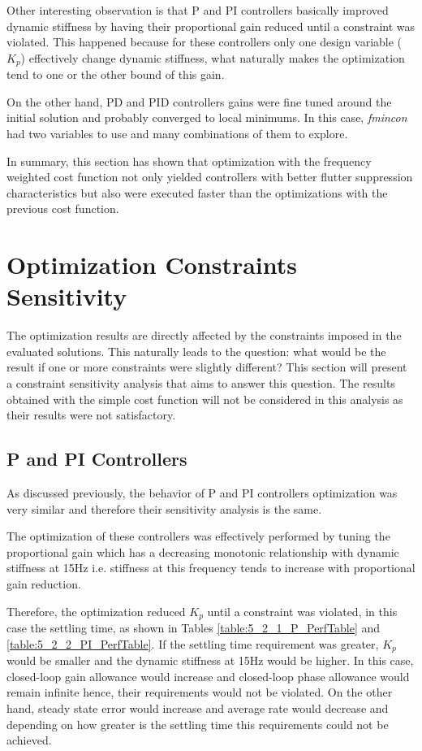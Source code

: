 Other interesting observation is that P and PI controllers basically improved dynamic stiffness by having their proportional gain reduced until a constraint was violated. This happened because for these controllers only one design variable ($K_p$) effectively change dynamic stiffness, what naturally makes the optimization tend to one or the other bound of this gain. 

On the other hand, PD and PID controllers gains were fine tuned around the initial solution and probably converged to local minimums. In this case, \textit{fmincon} had two variables to use and many combinations of them to explore.

In summary, this section has shown that optimization with the frequency weighted cost function not only yielded controllers with better flutter suppression characteristics but also were executed faster than the optimizations with the previous cost function. 

\section{Optimization Constraints Sensitivity}

The optimization results are directly affected by the constraints imposed in the evaluated solutions. This naturally leads to the question: what would be the result if one or more constraints were slightly different? This section will present a constraint sensitivity analysis that aims to answer this question. The results obtained with the simple cost function will not be considered in this analysis as their results were not satisfactory.

\subsection{P and PI Controllers}

As discussed previously, the behavior of P and PI controllers optimization was very similar and therefore their sensitivity analysis is the same.

The optimization of these controllers was effectively performed by tuning the proportional gain which has a decreasing monotonic relationship with dynamic stiffness at 15Hz i.e. stiffness at this frequency tends to increase with proportional gain reduction. 

Therefore, the optimization reduced $K_p$ until a constraint was violated, in this case the settling time, as shown in Tables \ref{table:5_2_1_P_PerfTable} and \ref{table:5_2_2_PI_PerfTable}. If the settling time requirement was greater, $K_p$ would be smaller and the dynamic stiffness at 15Hz would be higher. In this case, closed-loop gain allowance would increase and closed-loop phase allowance would remain infinite hence, their requirements would not be violated. On the other hand, steady state error would increase and average rate would decrease and depending on how greater is the settling time this requirements could not be achieved.

